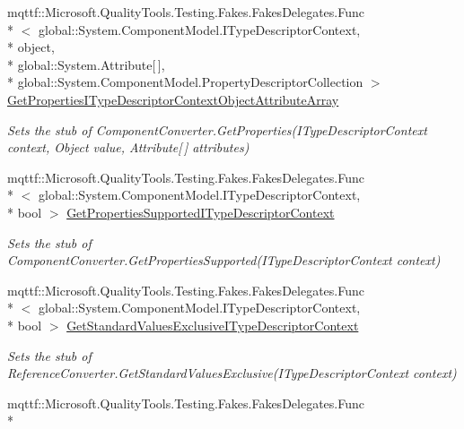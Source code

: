 \begin{DoxyCompactItemize}
mqttf\-::\-Microsoft.\-Quality\-Tools.\-Testing.\-Fakes.\-Fakes\-Delegates.\-Func\\*
$<$ global\-::\-System.\-Component\-Model.\-I\-Type\-Descriptor\-Context, \\*
object, \\*
global\-::\-System.\-Attribute\mbox{[}$\,$\mbox{]}, \\*
global\-::\-System.\-Component\-Model.\-Property\-Descriptor\-Collection $>$ \hyperlink{class_system_1_1_component_model_1_1_fakes_1_1_stub_component_converter_aa381d6dd410bafa26d5ecea9d54a9bea}{Get\-Properties\-I\-Type\-Descriptor\-Context\-Object\-Attribute\-Array}
\begin{DoxyCompactList}\small\item\em Sets the stub of Component\-Converter.\-Get\-Properties(\-I\-Type\-Descriptor\-Context context, Object value, Attribute\mbox{[}$\,$\mbox{]} attributes)\end{DoxyCompactList}\item 
mqttf\-::\-Microsoft.\-Quality\-Tools.\-Testing.\-Fakes.\-Fakes\-Delegates.\-Func\\*
$<$ global\-::\-System.\-Component\-Model.\-I\-Type\-Descriptor\-Context, \\*
bool $>$ \hyperlink{class_system_1_1_component_model_1_1_fakes_1_1_stub_component_converter_afd46cf5276f351980b61d0b0f936ad2f}{Get\-Properties\-Supported\-I\-Type\-Descriptor\-Context}
\begin{DoxyCompactList}\small\item\em Sets the stub of Component\-Converter.\-Get\-Properties\-Supported(\-I\-Type\-Descriptor\-Context context)\end{DoxyCompactList}\item 
mqttf\-::\-Microsoft.\-Quality\-Tools.\-Testing.\-Fakes.\-Fakes\-Delegates.\-Func\\*
$<$ global\-::\-System.\-Component\-Model.\-I\-Type\-Descriptor\-Context, \\*
bool $>$ \hyperlink{class_system_1_1_component_model_1_1_fakes_1_1_stub_component_converter_ab0461f4b6c0c4c9a402852dd24e12053}{Get\-Standard\-Values\-Exclusive\-I\-Type\-Descriptor\-Context}
\begin{DoxyCompactList}\small\item\em Sets the stub of Reference\-Converter.\-Get\-Standard\-Values\-Exclusive(\-I\-Type\-Descriptor\-Context context)\end{DoxyCompactList}\item 
mqttf\-::\-Microsoft.\-Quality\-Tools.\-Testing.\-Fakes.\-Fakes\-Delegates.\-Func\\*

\end{DoxyCompactItemize}
